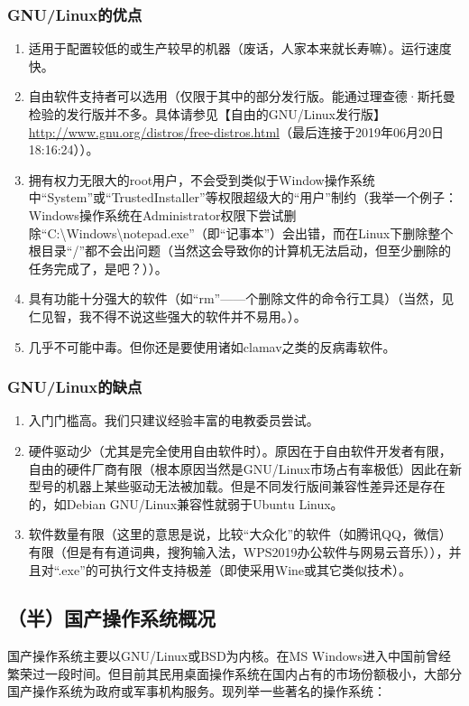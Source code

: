 \subsubsection{GNU/Linux的优点}
\begin{enumerate}
	\item  适用于配置较低的或生产较早的机器（废话，人家本来就长寿嘛）。运行速度快。\par
	\item 自由软件支持者可以选用（仅限于其中的部分发行版。能通过理查德·斯托曼检验的发行版并不多。具体请参见【自由的GNU/Linux发行版】\url{http://www.gnu.org/distros/free-distros.html}（最后连接于2019年06月20日18:16:24））。\par
	\item 拥有权力无限大的root用户，不会受到类似于Window操作系统中“System”或“TrustedInstaller”等权限超级大的“用户”制约（我举一个例子：Windows操作系统在Administrator权限下尝试删除“C:\textbackslash Windows\textbackslash notepad.exe”（即“记事本”）会出错，而在Linux下删除整个根目录“/”都不会出问题（当然这会导致你的计算机无法启动，但至少删除的任务完成了，是吧？））。\par
	\item 具有功能十分强大的软件（如“rm”——个删除文件的命令行工具）（当然，见仁见智，我不得不说这些强大的软件并不易用。）。
	\item 几乎不可能中毒。但你还是要使用诸如clamav之类的反病毒软件。
\end{enumerate}
\subsubsection{GNU/Linux的缺点}
\begin{enumerate}
	\item 入门门槛高。我们只建议经验丰富的电教委员尝试。
	\item 硬件驱动少（尤其是完全使用自由软件时）。原因在于自由软件开发者有限，自由的硬件厂商有限（根本原因当然是GNU/Linux市场占有率极低）因此在新型号的机器上某些驱动无法被加载。但是不同发行版间兼容性差异还是存在的，如Debian GNU/Linux兼容性就弱于Ubuntu Linux。
	\item 软件数量有限（这里的意思是说，比较“大众化”的软件（如腾讯QQ，微信）有限（但是有有道词典，搜狗输入法，WPS2019办公软件与网易云音乐）），并且对“.exe”的可执行文件支持极差（即使采用Wine或其它类似技术）。	
\end{enumerate}
\subsection{（半）国产操作系统概况}
国产操作系统主要以GNU/Linux或BSD为内核。在MS Windows进入中国前曾经繁荣过一段时间。但目前其民用桌面操作系统在国内占有的市场份额极小，大部分国产操作系统为政府或军事机构服务。现列举一些著名的操作系统：
